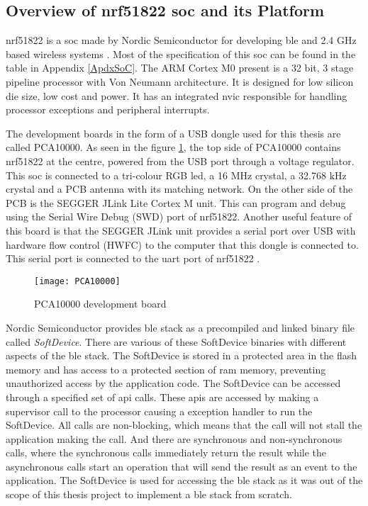 \subsection{Overview of nrf51822 \texorpdfstring{\gls{soc}}{SoC} and its Platform} \label{5nrfPCA}

nrf51822 is a \gls{soc} made by Nordic Semiconductor for developing \gls{ble} and 2.4 GHz based wireless systems \cite{nrf51822page}. Most of the specification of this \gls{soc} can be found in the table in Appendix \ref{ApdxSoC}. The ARM Cortex M0 present is a 32 bit, 3 stage pipeline processor with Von Neumann architecture. It is designed for low silicon die size, low cost and power. It has an integrated \gls{nvic}  responsible for handling processor exceptions and peripheral interrupts. 

The development boards in the form of a USB dongle used for this thesis are called PCA10000. As seen in the figure \ref{pca10000}, the top side of PCA10000 contains nrf51822 at the centre, powered from the USB port through a voltage regulator. This \gls{soc} is connected to a tri-colour RGB led, a 16 MHz crystal, a 32.768  kHz crystal and a PCB antenna with its matching network. On the other side of the PCB is the SEGGER JLink Lite Cortex M unit. This can program and debug using the Serial Wire Debug (SWD) port of nrf51822. Another useful feature of this board is that the SEGGER JLink unit provides a serial port over USB with hardware flow control (HWFC) to the computer that this dongle is connected to. This serial port is connected to the \gls{uart} port of nrf51822 \cite{PrithviR}.

\begin{figure}[h]
\texttt{[image: PCA10000]}
\caption{PCA10000 development board}
\label{pca10000}
\end{figure} 

Nordic Semiconductor provides \gls{ble} stack as a precompiled and linked binary file called \emph{SoftDevice}. There are various of these SoftDevice binaries with different aspects of the \gls{ble} stack. The SoftDevice is stored in a protected area in the flash memory and has access to a protected section of \gls{ram} memory, preventing unauthorized access by the application code. The SoftDevice can be accessed through a specified set of \gls{api} calls. These \glspl{api} are accessed by making a supervisor call to the processor causing a exception handler to run the SoftDevice. All calls are non-blocking, which means that the call will not stall the application making the call. And there are synchronous and non-synchronous calls, where the synchronous calls immediately return the result while the asynchronous calls start an operation that will send the result as an event to the application. The SoftDevice is used for accessing the \gls{ble} stack as it was out of the scope of this thesis project to implement a \gls{ble} stack from scratch.

